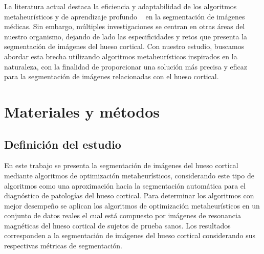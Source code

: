 \documentclass[conference]{IEEEtran}
\begin{document}
\noindent La literatura actual destaca la eficiencia y adaptabilidad de los algoritmos metaheurísticos y de aprendizaje profundo ~\cite{jones2023automated} en la segmentación de imágenes médicas. Sin embargo, múltiples investigaciones se centran en otras áreas del nuestro organismo, dejando de lado las especificidades y retos que presenta la segmentación de imágenes del hueso cortical. Con nuestro estudio, buscamos abordar esta brecha utilizando algoritmos metaheurísticos inspirados en la naturaleza, con la finalidad de proporcionar una solución más precisa y eficaz para la segmentación de imágenes relacionadas con el hueso cortical.
















\section{Materiales y métodos}

\subsection{Definición del estudio}


\noindent En este trabajo se presenta la segmentación de imágenes del hueso cortical mediante algoritmos de optimización metaheurísticos, considerando este tipo de algoritmos como una aproximación hacia la segmentación automática para el diagnóstico de patologías del hueso cortical. Para determinar los algoritmos con mejor desempeño se aplican los algoritmos de optimización metaheurísticos en un conjunto de datos reales el cual está compuesto por imágenes de resonancia magnéticas del hueso cortical de sujetos de prueba sanos. Los resultados corresponden a la segmentación de imágenes del hueso cortical considerando sus respectivas métricas de segmentación.
\end{document}
